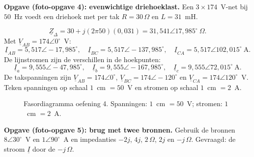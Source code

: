 \documentclass[a4paper,11pt]{article}
\begin{document}
\textbf{Opgave (foto-opgave 4): evenwichtige driehoeklast.}
Een $3\times174$~V-net bij $50$~Hz voedt een driehoek met per tak $R=30\,\Omega$ en
$L=31$~mH.
\begin{oefenblok}
    \[
        \underline{Z}_\Delta=30+j(2\pi50)(0{,}031)
        =31{,}541\angle17{,}985^\circ\ \Omega.
    \]
    Met $\underline{V}_{AB}=174\angle0^\circ$~V:
    \[
        \underline{I}_{AB}=5{,}517\angle-17{,}985^\circ,\quad
        \underline{I}_{BC}=5{,}517\angle-137{,}985^\circ,\quad
        \underline{I}_{CA}=5{,}517\angle102{,}015^\circ\ \text{A}.
    \]
    De lijnstromen zijn de verschillen in de hoekpunten:
    \[
        \boxed{\underline{I}_a=9{,}555\angle-47{,}985^\circ},\quad
        \boxed{\underline{I}_b=9{,}555\angle-167{,}985^\circ},\quad
        \boxed{\underline{I}_c=9{,}555\angle72{,}015^\circ\ \text{A}}.
    \]
    De takspanningen zijn $\underline{V}_{AB}=174\angle0^\circ$,
    $\underline{V}_{BC}=174\angle-120^\circ$ en
    $\underline{V}_{CA}=174\angle120^\circ$~V. Teken spanningen op schaal $1$~cm
    $=50$~V en stromen op schaal $1$~cm $=2$~A.
    \begin{figure}[H]\centering
        \caption{Fasordiagramma oefening 4. Spanningen: $1$~cm $=50$~V; stromen: $1$~cm $=2$~A.}
    \end{figure}\FloatBarrier
\end{oefenblok}

\textbf{Opgave (foto-opgave 5): brug met twee bronnen.}
Gebruik de bronnen $8\angle30^\circ$~V en $1\angle90^\circ$~A en impedanties
$-2j$, $4j$, $2\,\Omega$, $2j$ en $-j\,\Omega$. Gevraagd: de stroom $\underline{I}$ door de
$-j\,\Omega$.
\end{document}
